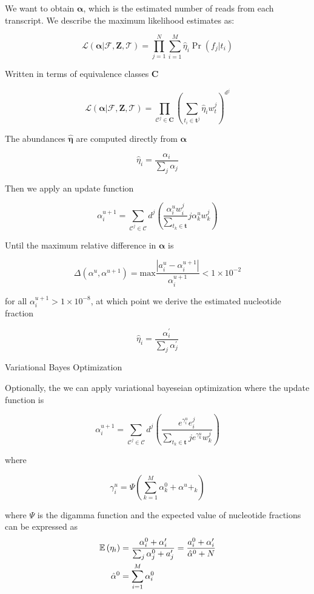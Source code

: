 We want to obtain \(\pmb{\alpha}\), which is the estimated number of
reads from each transcript. We describe the maximum likelihood estimates
as:

\[\mathcal{L} \left( \pmb{\alpha} |\mathcal{F}, \pmb{Z},\mathcal{T} \right)  = \prod^{N}_{j=1} \sum^{M}_{i=1} \hat \eta_i \Pr\left(  f_j|t_i\right)\]

Written in terms of equivalence classes \(\pmb{C}\)

\[\mathcal{L} \left( \pmb{\alpha} |\mathcal{F}, \pmb{Z},\mathcal{T} \right)  = \prod^{}_{\mathcal{C}^j \in \pmb{C}} \left( \sum_{t_i \in  \pmb{t}^j} \hat \eta_i w_t^j\right) ^{d^{j}}\]

The abundances \(\pmb{\hat \eta}\) are computed directly from
\(\pmb{\alpha}\)

\[\hat \eta_i= \dfrac{\alpha_i}{\sum_j \alpha_j}\]

Then we apply an update function

\[\alpha_i ^{u+1} = \sum^{}_{\mathcal{C}^j \in \pmb{\mathcal{C}}} d ^{j} \left( \dfrac{\alpha_i^u w_i^j}{\sum^{}_{t_k \in \pmb{t}}} j \alpha^u_k w_k^j\right)\]

Until the maximum relative difference in \( \pmb{\alpha}\) is

\[\Delta \left( \alpha^u, \alpha ^{u+1} \right) = \mathrm{max} \dfrac{\left| a_i^u  - \alpha_i ^{u+1}\right| }{ \alpha_i ^{u+1}} < 1 \times 10 ^{-2}\]

for all \(\alpha_i ^{u+1} > 1 \times 10 ^{-8}\), at which point we
derive the estimated nucleotide fraction

\[\hat \eta_i =\dfrac{\alpha_i ^{\prime} }{ \sum_j \alpha ^{\prime} _j}\]

Variational Bayes Optimization

Optionally, the we can apply variational bayeseian optimization where
the update function is

\[\alpha_i ^{u+1} = \sum^{}_{\mathcal{C}^j \in \pmb{\mathcal{C}}} d ^{j} \left( \dfrac{e ^{ \gamma ^u_i} e_i^j}{\sum^{}_{t_k \in \pmb{t}} j e ^{\gamma ^u _k}w^j_k} \right)\]

where

\[\gamma^u_i = \Psi \left( \sum^{M}_{k=1} \alpha^0_k + \alpha^u+_k \right)\]

where \(\Psi\) is the digamma function and the expected value of
nucleotide fractions can be expressed as
\[
$$
\begin{align*}
	\mathbb{E} \left( \eta_i \right) &= \dfrac{\alpha_i^0 + \alpha_i ^{\prime} }{\sum^{}_{j} \alpha^0_j + a ^{\prime} _j}= \dfrac{a_i^0 + \alpha_i ^{\prime} }{\hat \alpha^0 +N}\\
	\hat \alpha^0 &= \sum^{M}_{i = 1} \alpha_i^0
\end{align*}
$$
\]